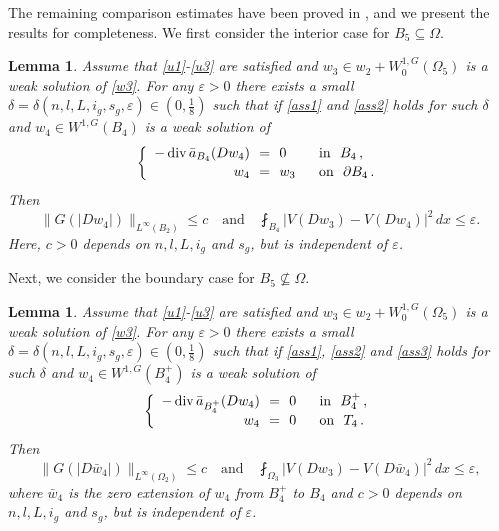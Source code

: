 \documentclass[10pt,a4paper]{article}
\newtheorem{lemma}[theorem]{Lemma}
\theoremstyle{definition}
\numberwithin{equation}{section}
\begin{document}
The remaining comparison estimates have been proved in \cite{cho1}, and we present the results for completeness. We first consider the interior case for $B_5\subseteq \Omega$.

	\begin{lemma}\label{w3w4l}
	Assume that \eqref{u1}-\eqref{u3} are satisfied and   $w_3 \in w_2+ W_0^{1,G}(\Omega_5)$  is a weak solution of \eqref{w3}. 
	For any $\varepsilon > 0$ there exists a small $\delta=\delta(n,l,L,i_g,s_g,\varepsilon) \in (0,\frac{1}{8})$ such that if \eqref{ass1}  and \eqref{ass2}   holds for such $\delta$ and  $w_4 \in W^{1,G}(B_4)$ is a weak solution of 
	\begin{equation*} 
		\left\{\begin{array}{r@{\ \ }c@{\ \ }ll}
			-\operatorname{div}\bar{a}_{B_4}(Dw_4) &=&0 \ \ &\mbox{in}\ \   B_4 \,,  \\[0.05cm]
			w_4 &=&w_3 \ \ &\mbox{on}\ \ \partial B_4 \,.
		\end{array}\right.
	\end{equation*}
	Then
	\begin{equation*} 
		\|G(|Dw_4|)\|_{L^{\infty}(B_2)} \leq c \quad \text{and} \quad \fint_{B_4} |V(Dw_3)-V(Dw_4)|^2\,dx \leq \varepsilon.  
	\end{equation*}
	Here, $c > 0$ depends on $n,l,L,i_g$ and $s_g$, but is independent of $\varepsilon$.
\end{lemma}





Next, we consider the boundary case for $B_5\nsubseteq \Omega$. 

		\begin{lemma}\label{w3w4b}
		Assume that \eqref{u1}-\eqref{u3} are satisfied and   $w_3 \in w_2+ W_0^{1,G}(\Omega_5)$  is a weak solution of \eqref{w3}. 
		For any $\varepsilon > 0$ there exists a small $\delta=\delta(n,l,L,i_g,s_g,\varepsilon) \in (0,\frac{1}{8})$ such that if \eqref{ass1},  \eqref{ass2} and \eqref{ass3} holds for such $\delta$ and  $w_4 \in W^{1,G}(B_4^+)$ is a weak solution of 
		\begin{equation*} 
			\left\{\begin{array}{r@{\ \ }c@{\ \ }ll}
				-\operatorname{div}\bar{a}_{B_4^+}(Dw_4) &=&0 \ \ &\mbox{in}\ \   B_4^+ \,,  \\[0.05cm]
				w_4 &=&0 \ \ &\mbox{on}\ \   T_4 \,.
			\end{array}\right.
		\end{equation*}
		Then
		\begin{equation*} 
			\|G(|D\bar{w}_4|)\|_{L^{\infty}(\Omega_2)} \leq c \quad \text{and} \quad \fint_{\Omega_3} |V(Dw_3)-V(D\bar{w}_4)|^2\,dx \leq \varepsilon,  
		\end{equation*}
	where $\bar{w}_4$ is the zero extension of $w_4$ from $B_4^+$ to $B_4$ and $c > 0$ depends on $n,l,L,i_g$ and $s_g$, but is independent of $\varepsilon$.
	\end{lemma}
	
\end{document}
